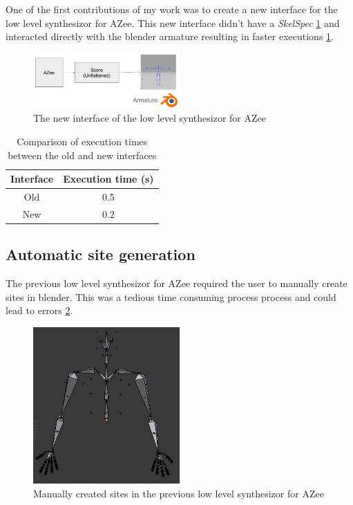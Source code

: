 \documentclass[../../main.tex]{subfiles}
\begin{document}
One of the first contributions of my work was to create a new interface for the low level synthesizor for AZee. This new interface didn't have a \emph{SkelSpec} \ref{fig:new_interface} and interacted directly with the blender armature resulting in faster executions \ref{tab:faster_executions}.

\begin{figure}[h]
    \centering
    \includegraphics[width=0.5\textwidth]{chapters/rigging_layers/images/new_interface.png}
    \caption{The new interface of the low level synthesizor for AZee}
    \label{fig:new_interface}
\end{figure}

\begin{table}
    \centering
    \begin{tabular}{|c|c|}
        \hline
        \textbf{Interface} & \textbf{Execution time (s)} \\
        \hline
        Old & 0.5 \\
        New & 0.2 \\
        \hline
    \end{tabular}
    \caption{Comparison of execution times between the old and new interfaces}
    \label{tab:faster_executions}
\end{table}

\subsection{Automatic site generation}

The previous low level synthesizor for AZee \cite{fabrizio} required the user to manually create sites in blender. This was a tedious time consuming process process and could lead to errors \ref{fig:prev_sites}.

\begin{figure}[h]
    \centering
    \includegraphics[width=0.5\textwidth]{chapters/rigging_layers/images/prev_sites.png}
    \caption{Manually created sites in the previous low level synthesizor for AZee}
    \label{fig:prev_sites}
\end{figure}
\end{document}
